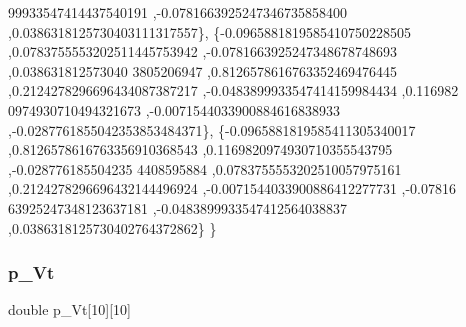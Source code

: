 \begin{DoxyCode}
      99933547414437540191 ,-0.0781663925247346735858400 ,0.0386318125730403111317557\},
\{-0.0965881819585410750228505 ,0.0783755553202511445753942 ,-0.0781663925247348678748693 ,0.038631812573040
      3805206947 ,0.8126578616763352469476445 ,0.2124278296696434087387217 ,-0.0483899933547414159984434 ,0.116982
      0974930710494321673 ,-0.0071544033900884616838933 ,-0.0287761855042353853484371\},
\{-0.0965881819585411305340017 ,0.8126578616763356910368543 ,0.1169820974930710355543795 ,-0.028776185504235
      4408595884 ,0.0783755553202510057975161 ,0.2124278296696432144496924 ,-0.0071544033900886412277731 ,-0.07816
      63925247348123637181 ,-0.0483899933547412564038837 ,0.0386318125730402764372862\}
\}
\end{DoxyCode}
\mbox{\label{a00452_a3c1835d0405d5df5620a8e30be6fef99}} 
\subsubsection{\texorpdfstring{p\+\_\+\+Vt}{p\_Vt}}
{\footnotesize\ttfamily double p\+\_\+\+Vt\mbox{[}10\mbox{]}\mbox{[}10\mbox{]}}

